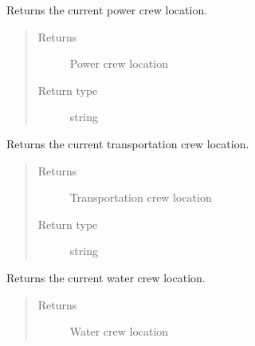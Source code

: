 \documentclass[letterpaper,10pt,english]{sphinxmanual}
\begin{document}
\begin{fulllineitems}

\begin{fulllineitems}
\label{\detokenize{apidoc:dreaminsg_integrated_model.src.network_sim_models.integrated_network.IntegratedNetwork.get_power_crew_loc}}
\sphinxAtStartPar
Returns the current power crew location.
\begin{quote}\begin{description}
\item[{Returns}] \leavevmode
\sphinxAtStartPar
Power crew location

\item[{Return type}] \leavevmode
\sphinxAtStartPar
string

\end{description}\end{quote}

\end{fulllineitems}


\begin{fulllineitems}
\label{\detokenize{apidoc:dreaminsg_integrated_model.src.network_sim_models.integrated_network.IntegratedNetwork.get_transpo_crew_loc}}
\sphinxAtStartPar
Returns the current transportation crew location.
\begin{quote}\begin{description}
\item[{Returns}] \leavevmode
\sphinxAtStartPar
Transportation crew location

\item[{Return type}] \leavevmode
\sphinxAtStartPar
string

\end{description}\end{quote}

\end{fulllineitems}


\begin{fulllineitems}
\label{\detokenize{apidoc:dreaminsg_integrated_model.src.network_sim_models.integrated_network.IntegratedNetwork.get_water_crew_loc}}
\sphinxAtStartPar
Returns the current water crew location.
\begin{quote}\begin{description}
\item[{Returns}] \leavevmode
\sphinxAtStartPar
Water crew location


\end{description}
\end{quote}
\end{fulllineitems}
\end{fulllineitems}
\end{document}
